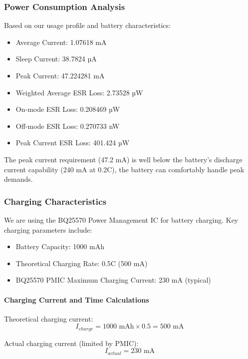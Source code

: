\documentclass[a4paper,11pt]{article}%
\begin{document}
\subsubsection{Power Consumption Analysis}

Based on our usage profile and battery characteristics:

\begin{itemize}
    \item Average Current: 1.07618 mA
    \item Sleep Current: 38.7824 µA
    \item Peak Current: 47.224281 mA
    \item Weighted Average ESR Loss: 2.73528 µW
    \item On-mode ESR Loss: 0.208469 µW
    \item Off-mode ESR Loss: 0.270733 nW
    \item Peak Current ESR Loss: 401.424 µW
\end{itemize}

The peak current requirement (47.2 mA) is well below the battery's discharge current capability (240 mA at 0.2C), the battery can comfortably handle peak demands.

\subsubsection{Charging Characteristics}

We are using the BQ25570 Power Management IC for battery charging. Key charging parameters include:

\begin{itemize}
    \item Battery Capacity: 1000 mAh
    \item Theoretical Charging Rate: 0.5C (500 mA)
    \item BQ25570 PMIC Maximum Charging Current: 230 mA (typical)
\end{itemize}

\paragraph{Charging Current and Time Calculations}

Theoretical charging current:
\begin{equation}
    I_{charge} = 1000 \text{ mAh} \times 0.5 = 500 \text{ mA}
\end{equation}

Actual charging current (limited by PMIC):
\begin{equation}
    I_{actual} = 230 \text{ mA}
\end{equation}
\end{document}
